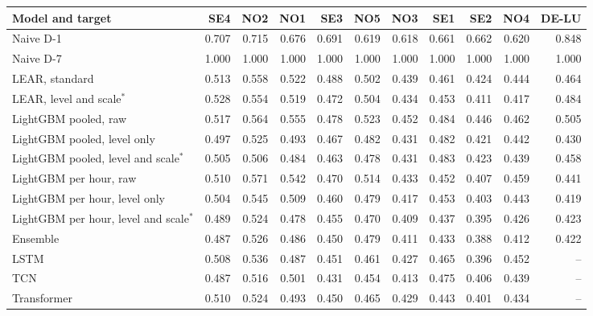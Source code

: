 \begin{tabular}{lrrrrrrrrrr}
\toprule
Model and target & SE4 & NO2 & NO1 & SE3 & NO5 & NO3 & SE1 & SE2 & NO4 & DE-LU \\
\midrule
Naive D-1 & 0.707 & 0.715 & 0.676 & 0.691 & 0.619 & 0.618 & 0.661 & 0.662 & 0.620 & 0.848 \\
Naive D-7 & 1.000 & 1.000 & 1.000 & 1.000 & 1.000 & 1.000 & 1.000 & 1.000 & 1.000 & 1.000 \\
LEAR, standard & 0.513 & 0.558 & 0.522 & 0.488 & 0.502 & 0.439 & 0.461 & 0.424 & 0.444 & 0.464 \\
LEAR, level and scale$^{*}$ & 0.528 & 0.554 & 0.519 & 0.472 & 0.504 & 0.434 & 0.453 & 0.411 & 0.417 & 0.484 \\
LightGBM pooled, raw & 0.517 & 0.564 & 0.555 & 0.478 & 0.523 & 0.452 & 0.484 & 0.446 & 0.462 & 0.505 \\
LightGBM pooled, level only & 0.497 & 0.525 & 0.493 & 0.467 & 0.482 & 0.431 & 0.482 & 0.421 & 0.442 & 0.430 \\
LightGBM pooled, level and scale$^{*}$ & 0.505 & 0.506 & 0.484 & 0.463 & 0.478 & 0.431 & 0.483 & 0.423 & 0.439 & 0.458 \\
LightGBM per hour, raw & 0.510 & 0.571 & 0.542 & 0.470 & 0.514 & 0.433 & 0.452 & 0.407 & 0.459 & 0.441 \\
LightGBM per hour, level only & 0.504 & 0.545 & 0.509 & 0.460 & 0.479 & 0.417 & 0.453 & 0.403 & 0.443 & 0.419 \\
LightGBM per hour, level and scale$^{*}$ & 0.489 & 0.524 & 0.478 & 0.455 & 0.470 & 0.409 & 0.437 & 0.395 & 0.426 & 0.423 \\
Ensemble & 0.487 & 0.526 & 0.486 & 0.450 & 0.479 & 0.411 & 0.433 & 0.388 & 0.412 & 0.422 \\
LSTM & 0.508 & 0.536 & 0.487 & 0.451 & 0.461 & 0.427 & 0.465 & 0.396 & 0.452 & -- \\
TCN & 0.487 & 0.516 & 0.501 & 0.431 & 0.454 & 0.413 & 0.475 & 0.406 & 0.439 & -- \\
Transformer & 0.510 & 0.524 & 0.493 & 0.450 & 0.465 & 0.429 & 0.443 & 0.401 & 0.434 & -- \\
\bottomrule
\end{tabular}
